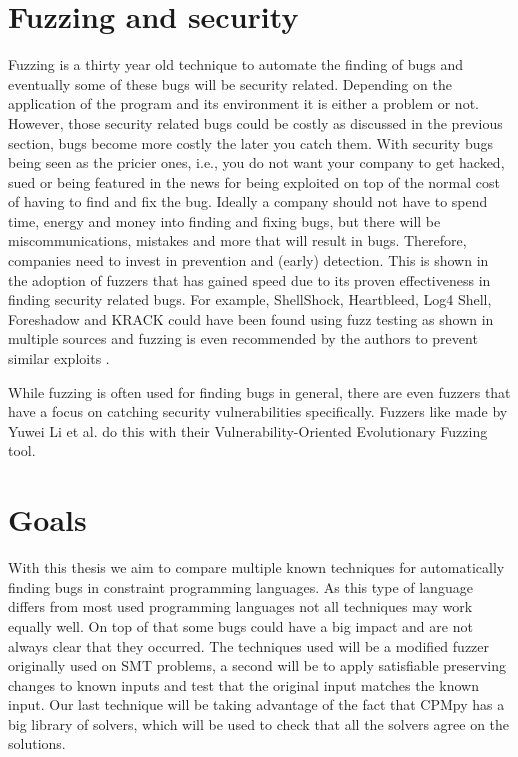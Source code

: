 \section{Fuzzing and security}
\label{intro:FussingSecurity}
Fuzzing is a thirty year old technique to automate the finding of bugs and eventually some of these bugs will be security related. Depending on the application of the program and its environment it is either a problem or not. However, those security related bugs could be costly as discussed in the previous section, bugs become more costly the later you 
catch them. With security bugs being seen as the pricier ones, i.e., you do not want your company to get hacked, sued or being featured in the news for being exploited on top of the normal cost of having to find and fix the bug. %
Ideally a company should not have to spend time, energy and money into finding and fixing bugs, but there will be miscommunications, mistakes and more that will result in bugs. Therefore, companies need to invest in prevention and (early) detection. This is shown in the adoption of fuzzers that has gained speed due to its proven effectiveness in finding security related bugs. For example, ShellShock, Heartbleed, Log4 Shell, Foreshadow and KRACK could have been found using fuzz testing as shown in multiple sources \cite{HeartbleedViaFuzzing, 34ForeshadowViaFuzz, ShellShockViaFuzzing, Log4ShellViaFuzzing} and fuzzing is even recommended by the authors to prevent similar exploits \cite{35ForeshadowFuzzRecom, 33KrackViaFuzz}.

While fuzzing is often used for finding bugs in general, there are even fuzzers that have a focus on catching security vulnerabilities specifically. Fuzzers like made by Yuwei Li et al. \cite{32V-Fuzz} do this with their Vulnerability-Oriented Evolutionary Fuzzing tool.

\section{Goals}
\label{intro:Goals}
With this thesis we aim to compare multiple known techniques for automatically finding bugs in constraint programming languages. As this type of language differs from most used programming languages not all techniques may work equally well. On top of that some bugs could have a big impact and are not always clear that they occurred.
The techniques used will be a modified fuzzer originally used on SMT problems, a second will be to apply satisfiable preserving changes to known inputs and test that the original input matches the known input. Our last technique will be taking advantage of the fact that CPMpy has a big library of solvers, which will be used to check that all the solvers agree on the solutions.

